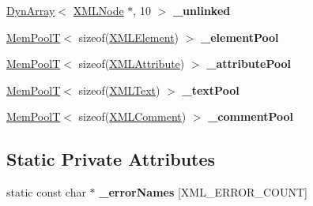 \begin{DoxyCompactItemize}
\mbox{\hyperlink{classtinyxml2_1_1DynArray}{Dyn\+Array}}$<$ \mbox{\hyperlink{classtinyxml2_1_1XMLNode}{X\+M\+L\+Node}} $\ast$, 10 $>$ {\bfseries \+\_\+unlinked}
\item 
\mbox{\label{classtinyxml2_1_1XMLDocument_a21574fba363a0d23bfc820d1652ab8bc}} 
\mbox{\hyperlink{classtinyxml2_1_1MemPoolT}{Mem\+PoolT}}$<$ sizeof(\mbox{\hyperlink{classtinyxml2_1_1XMLElement}{X\+M\+L\+Element}}) $>$ {\bfseries \+\_\+element\+Pool}
\item 
\mbox{\label{classtinyxml2_1_1XMLDocument_a0a57ebeba23bc6cfce88f12b4a946aac}} 
\mbox{\hyperlink{classtinyxml2_1_1MemPoolT}{Mem\+PoolT}}$<$ sizeof(\mbox{\hyperlink{classtinyxml2_1_1XMLAttribute}{X\+M\+L\+Attribute}}) $>$ {\bfseries \+\_\+attribute\+Pool}
\item 
\mbox{\label{classtinyxml2_1_1XMLDocument_afe8ac410aaa53cf1f2142a4c2fd958c7}} 
\mbox{\hyperlink{classtinyxml2_1_1MemPoolT}{Mem\+PoolT}}$<$ sizeof(\mbox{\hyperlink{classtinyxml2_1_1XMLText}{X\+M\+L\+Text}}) $>$ {\bfseries \+\_\+text\+Pool}
\item 
\mbox{\label{classtinyxml2_1_1XMLDocument_ac2e73ccbc037dee917c3163158180398}} 
\mbox{\hyperlink{classtinyxml2_1_1MemPoolT}{Mem\+PoolT}}$<$ sizeof(\mbox{\hyperlink{classtinyxml2_1_1XMLComment}{X\+M\+L\+Comment}}) $>$ {\bfseries \+\_\+comment\+Pool}
\end{DoxyCompactItemize}
\subsection*{Static Private Attributes}
\begin{DoxyCompactItemize}
\item 
\mbox{\label{classtinyxml2_1_1XMLDocument_aaa8fd366adfb2c368ed7c13e471f54ae}} 
static const char $\ast$ {\bfseries \+\_\+error\+Names} \mbox{[}X\+M\+L\+\_\+\+E\+R\+R\+O\+R\+\_\+\+C\+O\+U\+NT\mbox{]}
\end{DoxyCompactItemize}
